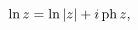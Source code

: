 \[\mathop{\ln\/}\nolimits z=\mathop{\ln\/}\nolimits\left|z\right|+i\mathop{%
\mathrm{ph}\/}\nolimits z,\]